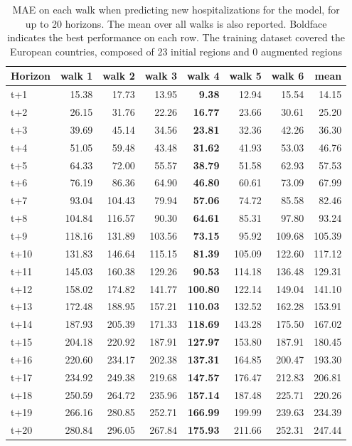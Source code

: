 \begin{table}[H]
\centering
\caption{MAE on each walk when predicting new hospitalizations for the model, for up to 20 horizons. The mean over all walks is also reported. Boldface indicates the best performance on each row. The training dataset covered the European countries, composed of 23 initial regions and 0 augmented regions }
\label{tab:MAE_walk_custom_linear_regression}
\begin{tabular}{lrrrrrrr}
\toprule
Horizon &  walk 1 &  walk 2 &  walk 3 &  walk 4 &  walk 5 &  walk 6 &   mean \\
\midrule
t+1  & 15.38  & 17.73  & 13.95  & \textbf{9.38}  & 12.94  & 15.54  & 14.15  \\
t+2  & 26.15  & 31.76  & 22.26  & \textbf{16.77}  & 23.66  & 30.61  & 25.20  \\
t+3  & 39.69  & 45.14  & 34.56  & \textbf{23.81}  & 32.36  & 42.26  & 36.30  \\
t+4  & 51.05  & 59.48  & 43.48  & \textbf{31.62}  & 41.93  & 53.03  & 46.76  \\
t+5  & 64.33  & 72.00  & 55.57  & \textbf{38.79}  & 51.58  & 62.93  & 57.53  \\
t+6  & 76.19  & 86.36  & 64.90  & \textbf{46.80}  & 60.61  & 73.09  & 67.99  \\
t+7  & 93.04  & 104.43  & 79.94  & \textbf{57.06}  & 74.72  & 85.58  & 82.46  \\
t+8  & 104.84  & 116.57  & 90.30  & \textbf{64.61}  & 85.31  & 97.80  & 93.24  \\
t+9  & 118.16  & 131.89  & 103.56  & \textbf{73.15}  & 95.92  & 109.68  & 105.39  \\
t+10  & 131.83  & 146.64  & 115.15  & \textbf{81.39}  & 105.09  & 122.60  & 117.12  \\
t+11  & 145.03  & 160.38  & 129.26  & \textbf{90.53}  & 114.18  & 136.48  & 129.31  \\
t+12  & 158.02  & 174.82  & 141.77  & \textbf{100.80}  & 122.14  & 149.04  & 141.10  \\
t+13  & 172.48  & 188.95  & 157.21  & \textbf{110.03}  & 132.52  & 162.28  & 153.91  \\
t+14  & 187.93  & 205.39  & 171.33  & \textbf{118.69}  & 143.28  & 175.50  & 167.02  \\
t+15  & 204.18  & 220.92  & 187.91  & \textbf{127.97}  & 153.80  & 187.91  & 180.45  \\
t+16  & 220.60  & 234.17  & 202.38  & \textbf{137.31}  & 164.85  & 200.47  & 193.30  \\
t+17  & 234.92  & 249.38  & 219.68  & \textbf{147.57}  & 176.47  & 212.83  & 206.81  \\
t+18  & 250.59  & 264.72  & 235.96  & \textbf{157.14}  & 187.48  & 225.71  & 220.26  \\
t+19  & 266.16  & 280.85  & 252.71  & \textbf{166.99}  & 199.99  & 239.63  & 234.39  \\
t+20  & 280.84  & 296.05  & 267.84  & \textbf{175.93}  & 211.66  & 252.31  & 247.44  \\

\bottomrule
\end{tabular}
\end{table}

